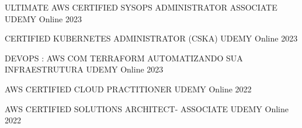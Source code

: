 

\begin{cvhonors}

  \cvhonor
    {ULTIMATE AWS CERTIFIED SYSOPS ADMINISTRATOR ASSOCIATE} %
    {UDEMY} %
    {Online} %
    {2023} %

  \cvhonor
    {CERTIFIED KUBERNETES ADMINISTRATOR (CSKA)} %
    {UDEMY} %
    {Online} %
    {2023} %

  \cvhonor
    {DEVOPS : AWS COM TERRAFORM AUTOMATIZANDO SUA INFRAESTRUTURA} %
    {UDEMY} %
    {Online} %
    {2023} %

  \cvhonor
    {AWS CERTIFIED CLOUD PRACTITIONER} %
    {UDEMY} %
    {Online} %
    {2022} %

  \cvhonor
    {AWS CERTIFIED SOLUTIONS ARCHITECT- ASSOCIATE} %
    {UDEMY} %
    {Online} %
    {2022} %


\end{cvhonors}
